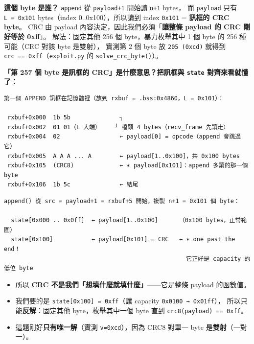 \documentclass[10pt,a4paper]{article}
\providecommand{\tightlist}{%
  \setlength{\itemsep}{0pt}\setlength{\parskip}{0pt}}
\begin{document}
\textbf{這個 byte 是誰？} \texttt{append} 從 \texttt{payload+1} 開始讀
\texttt{n+1} bytes， 而 \texttt{payload} 只有 \texttt{L\ \allowbreak{}=\ \allowbreak{}0x101}
bytes（index 0..0x100），所以讀到 index \texttt{0x101} = \textbf{訊框的
CRC byte}。 CRC 由 payload 內容決定，因此我們必須「\textbf{讓整條
payload 的 CRC 剛好等於 0xff}」。 解法：固定其他 256 個
byte，暴力枚舉其中 1 個 byte 的 256 種可能（CRC 對該 byte 是雙射），
實測第 2 個 byte 放 \texttt{205\ \allowbreak{}(0xcd)} 就得到
\texttt{crc\ \allowbreak{}==\ \allowbreak{}0xff}（\texttt{exploit.\allowbreak{}py} 的
\texttt{solve\_\allowbreak{}crc\_\allowbreak{}byte()}）。

\textbf{「第 257 個 byte 是訊框的 CRC」是什麼意思？把訊框與
\texttt{state} 對齊來看就懂了：}

\begin{Verbatim}[breaklines=true,breakanywhere=true,breakautoindent=false,fontsize=\fontsize{7.0}{9.5}\selectfont]
第一個 APPEND 訊框在記憶體裡（放到 rxbuf = .bss:0x4860，L = 0x101）：

 rxbuf+0x000  1b 5b              ┐
 rxbuf+0x002  01 01（L 大端）    ┘ 檔頭 4 bytes（recv_frame 先讀走）
 rxbuf+0x004  02                 ← payload[0] = opcode（append 會跳過它）
 rxbuf+0x005  A A A ... A        ← payload[1..0x100]，共 0x100 bytes
 rxbuf+0x105  (CRC8)             ← ✶ payload[0x101]：append 多讀的那一個 byte
 rxbuf+0x106  1b 5c              ← 結尾
\end{Verbatim}

\begin{Verbatim}[breaklines=true,breakanywhere=true,breakautoindent=false,fontsize=\fontsize{7.0}{9.5}\selectfont]
append() 從 src = payload+1 = rxbuf+5 開始，複製 n+1 = 0x101 個 byte：

  state[0x000 .. 0x0ff]  ← payload[1..0x100]      （0x100 bytes，正常範圍）
  state[0x100]           ← payload[0x101] = CRC   ← ✶ one past the end！
                                                    它正好是 capacity 的低位 byte
\end{Verbatim}

\begin{itemize}
\tightlist
\item
  所以 \textbf{CRC 不是我們「想填什麼就填什麼」}------它是整條 payload
  的函數值。
\item
  我們要的是 \texttt{state{[}0x100{]}\ \allowbreak{}=\ \allowbreak{}0xff}（讓 capacity
  \texttt{0x0100\ \allowbreak{}→\ \allowbreak{}0x01ff}）， 所以只能\textbf{反解}：固定其他
  byte，枚舉其中一個 byte 直到 \texttt{crc8(payload)\ \allowbreak{}==\ \allowbreak{}0xff}。
\item
  這題剛好\textbf{只有唯一解}（實測 \texttt{v=0xcd}），因為 CRC8 對單一
  byte 是\textbf{雙射}（一對一）。
\end{itemize}
\end{document}
